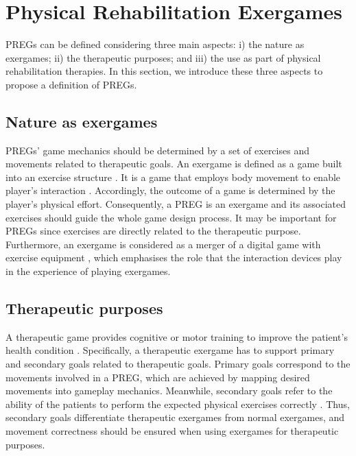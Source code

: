 \section{Physical Rehabilitation Exergames}\label{sec:def_reh_ex} %
\acp{PREG} can be defined considering three main aspects: i) the nature as exergames; ii) the therapeutic purposes; and iii) the use as part of physical rehabilitation therapies. In this section, we introduce these three aspects to propose a definition of \acp{PREG}.

\subsection{Nature as exergames}
\label{sub:def_ex}
\acp{PREG}' game mechanics should be determined by a set of exercises and movements related to therapeutic goals. An exergame is defined as a game built into an exercise structure \autocite{Pirovano2016}. It is a game that employs body movement to enable player's interaction \autocite{Mueller2011}. Accordingly, the outcome of a game is determined by the player's physical effort. Consequently, a \ac{PREG} is an exergame and its associated exercises should guide the whole game design process. It may be important for \acp{PREG} since exercises are directly related to the therapeutic purpose. Furthermore, an exergame is considered as a merger of a digital game with exercise equipment \autocite{Sinclair2009}, which emphasises the role that the interaction devices play in the experience of playing exergames.

\subsection{Therapeutic purposes}
\label{sub:def_therapeutic_g}
A therapeutic game provides cognitive or motor training to improve the patient's health condition \autocite{Mader2012}. Specifically, a therapeutic exergame has to support primary and secondary goals related to therapeutic goals. Primary goals correspond to the movements involved in a \ac{PREG}, which are achieved by mapping desired movements into gameplay mechanics. Meanwhile, secondary goals refer to the ability of the patients to perform the expected physical exercises correctly \autocite{Pirovano2016}. Thus, secondary goals differentiate therapeutic exergames from normal exergames, and movement correctness should be ensured when using exergames for therapeutic purposes.

